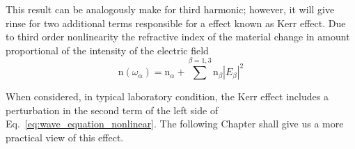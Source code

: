 This result can be analogously make for third harmonic; however, it will give rinse for two additional terms responsible for a effect known as Kerr effect\cite{Barclay2005}. Due to third order nonlinearity the refractive index of the material change in amount proportional of the intensity of the electric field
\begin{equation}
    \text{n}(\omega_\alpha) = \text{n}_\alpha + \sum^{\beta=1,3} \text{n}_\beta |E_\beta|^2
    \label{eq:kerr_effect_free_wave}
\end{equation}

When considered, in typical laboratory condition, the Kerr effect includes a perturbation in the second term of the left side of Eq.~\ref{eq:wave_equation_nonlinear}. The following Chapter shall give us a more practical view of this effect.